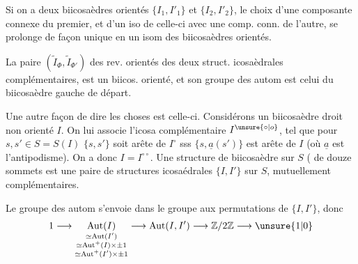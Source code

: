 Si on a deux biicosaèdres orientés
$\{I_1,I'_1\}$ et $\{I_2,I'_2\}$, le choix d'une 
composante connexe du premier, et d'un
iso de celle-ci avec une comp. conn. de
l'autre, se prolonge de façon unique en
un isom des biicosaèdres orientés.

La paire  $(\widetilde I_\Phi,\widetilde I_{\Phi'})$ des rev. orientés
des deux struct. icosaèdrales  complémentaires,
est un biicos. orienté, et son groupe des
autom est celui du  biicosaèdre
gauche de départ.

Une autre façon de dire les choses est
celle-ci. Considérons un biicosaèdre droit
non orienté $I$. On lui associe l'icosa
complémentaire $I^{\unsure{\circ|o}}$, tel que pour $s,s'\in S=S(I)$
$\{s,s'\}$ soit arête de $I^\circ$ sss $\{s,\underline a(s')\}$ est arête de
$I$ (où $\underline a$ est l'antipodisme). On a donc
$I=I^{\circ\circ}$.  Une structure
de biicosaèdre sur $S$ ( de douze sommets
est une paire de structures icosaédrales
$\{I,I'\}$ sur $S$, mutuellement complémentaires.

Le groupe des autom s'envoie dans
le groupe aux  permutations de $\{I,I'\}$, donc
\[
1\longrightarrow
\underset{\substack{\simeq\operatorname{Aut}(I')\\
\simeq\operatorname{Aut}^{+}(I)\times\pm1\\
\simeq\operatorname{Aut}^{+}(I')\times\pm1}}{\operatorname{Aut}(I)}
\longrightarrow\operatorname{Aut}(I,I')\longrightarrow\mathbb Z/2\mathbb Z
\longrightarrow\unsure{1|0}
\]
